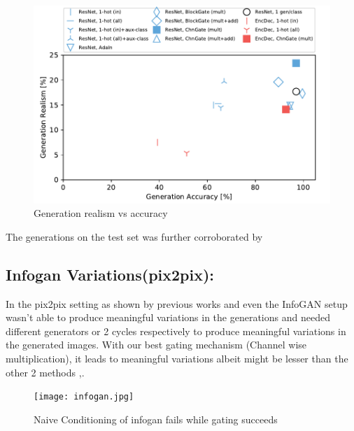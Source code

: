\begin{figure}
    \centering
    \includegraphics[width=\linewidth]{paper_images/gen_real_vs_acc.pdf}
    \caption{Generation realism vs accuracy}\label{fig:conditioning_amt}
\end{figure}

The generations on the test set was further corroborated by 

\subsection{Infogan Variations(pix2pix):}
In the pix2pix setting as shown by previous works \cite{ghosh2017multi} and \cite{zhu2017toward} even the InfoGAN setup wasn't able to produce meaningful variations in the generations and needed different generators or 2 cycles respectively to produce meaningful variations in the generated images. With our best gating mechanism (Channel wise multiplication), it leads to meaningful variations albeit might be lesser than the other 2 methods \cite{ghosh2017multi} ,\cite{zhu2017toward}.

\begin{figure}
    \centering
    \texttt{[image: infogan.jpg]}
    \caption{Naive Conditioning of infogan fails while gating succeeds}\label{fig:infogan_gate}
    \vspace{-4mm}
\end{figure}

